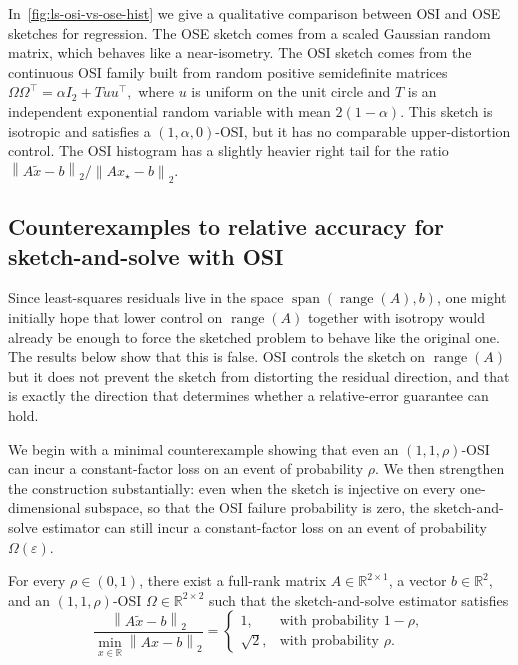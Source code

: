 \documentclass[onefignum,onetabnum]{siamart251216}
\newcommand{\R}{\mathbb{R}}
\newcommand{\norm}[1]{\left\lVert #1 \right\rVert}
\newcommand{\range}{\operatorname{range}}
\newcommand{\eps}{\varepsilon}
\begin{document}
In~\cref{fig:ls-osi-vs-ose-hist} we give a qualitative comparison between OSI and OSE sketches for regression.  The OSE sketch comes from a scaled Gaussian random matrix, which behaves like a near-isometry.  The OSI sketch comes from the continuous OSI family built from random positive semidefinite matrices
$
\Omega\Omega^\top = \alpha I_2 + Tuu^\top,
$
where $u$ is uniform on the unit circle and $T$ is an independent exponential random variable with mean $2(1-\alpha)$.  This sketch is isotropic and satisfies a $(1,\alpha,0)$-OSI,  but it has no comparable upper-distortion control. The OSI histogram has a slightly heavier right tail for the ratio $\norm{A\widetilde x-b}_2/\norm{A x_\star-b}_2$. 

\subsection{Counterexamples to relative accuracy for sketch-and-solve with OSI}

Since least-squares residuals live in the space $\operatorname{span}(\range(A),b)$,  one might initially hope that lower control on $\range(A)$ together with isotropy would already be enough to force the sketched problem to behave like the original one.  The results below show that this is false.  OSI controls the sketch on $\range(A)$ but it does not prevent the sketch from distorting the residual direction,  and that is exactly the direction that determines whether a relative-error guarantee can hold.

We begin with a minimal counterexample showing that even an $(1,1,\rho)$-OSI can incur a constant-factor loss on an event of probability $\rho$.  We then strengthen the construction substantially: even when the sketch is injective on every one-dimensional subspace,  so that the OSI failure probability is zero,  the sketch-and-solve estimator can still incur a constant-factor loss on an event of probability $\Omega(\eps)$. 

\begin{theorem}\label{thm:ls-counterexample}
For every $\rho \in (0,1)$, there exist a full-rank matrix $A\in\R^{2\times 1}$, a vector $b\in\R^2$, and an $(1,1,\rho)$-OSI $\Omega\in\R^{2\times 2}$ such that the sketch-and-solve estimator satisfies
\[
\frac{\norm{A\widetilde x-b}_2}{\min_{x\in\R} \norm{Ax-b}_2} = \begin{cases} 1, & \text{with probability $1-\rho$}, \\ \sqrt{2},& \text{with probability $\rho$}.
\end{cases} 
\]
\end{theorem}
\end{document}
